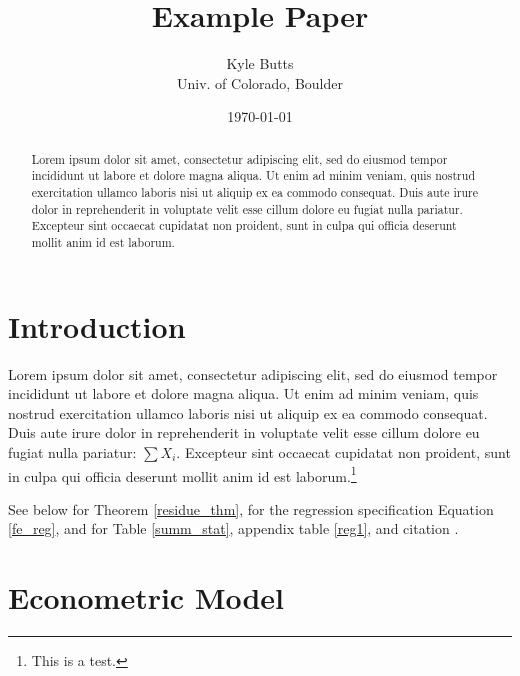 \documentclass[11pt]{article}
\title{\color{navyblue} Example Paper}
\author{\normalsize Kyle Butts\\{\footnotesize Univ. of Colorado, Boulder}}
\date{\footnotesize\today}
\begin{document}
\maketitle
\begin{abstract}
    Lorem ipsum dolor sit amet, consectetur adipiscing elit, sed do eiusmod tempor incididunt ut labore et dolore magna aliqua. Ut enim ad minim veniam, quis nostrud exercitation ullamco laboris nisi ut aliquip ex ea commodo consequat. Duis aute irure dolor in reprehenderit in voluptate velit esse cillum dolore eu fugiat nulla pariatur. Excepteur sint occaecat cupidatat non proident, sunt in culpa qui officia deserunt mollit anim id est laborum.
\end{abstract}

\newpage



\section{Introduction}

Lorem ipsum dolor sit amet, consectetur adipiscing elit, sed do eiusmod tempor incididunt ut labore et dolore magna aliqua. Ut enim ad minim veniam, quis nostrud exercitation ullamco laboris nisi ut aliquip ex ea commodo consequat. Duis aute irure dolor in reprehenderit in voluptate velit esse cillum dolore eu fugiat nulla pariatur: $\sum X_i$. Excepteur sint occaecat cupidatat non proident, sunt in culpa qui officia deserunt mollit anim id est laborum.\footnote{This is a test.}

See below for Theorem \ref{residue_thm}, for the regression specification Equation \ref{fe_reg}, and for Table \ref{summ_stat}, appendix table \ref{reg1}, and citation \citet{Eigen1971}.

\section{Econometric Model}

\end{document}
